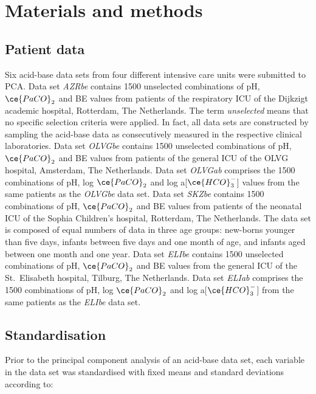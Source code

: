 \documentclass[
  12pt,
  a4paperpaper,
]{report}
\begin{document}
\hypertarget{materials-and-methods}{%
\section{Materials and methods}\label{materials-and-methods}}

\hypertarget{patient-data}{%
\subsection{Patient data}\label{patient-data}}

Six acid-base data sets from four different intensive care units were
submitted to PCA. Data set \emph{AZRbe} contains 1500 unselected
combinations of pH, \(\ce{PaCO}_{2}\) and BE values from patients of the
respiratory ICU of the Dijkzigt academic hospital, Rotterdam, The
Netherlands. The term \emph{unselected} means that no specific selection
criteria were applied. In fact, all data sets are constructed by
sampling the acid-base data as consecutively measured in the respective
clinical laboratories. Data set \emph{OLVGbe} contains 1500 unselected
combinations of pH, \(\ce{PaCO}_{2}\) and BE values from patients of the
general ICU of the OLVG hospital, Amsterdam, The Netherlands. Data set
\emph{OLVGab} comprises the 1500 combinations of pH, log
\(\ce{PaCO}_{2}\) and log a{[}\(\ce{HCO}_{3}^{-}\){]} values from the
same patients as the \emph{OLVGbe} data set. Data set \emph{SKZbe}
contains 1500 combinations of pH, \(\ce{PaCO}_{2}\) and BE values from
patients of the neonatal ICU of the Sophia Children's hospital,
Rotterdam, The Netherlands. The data set is composed of equal numbers of
data in three age groups: new-borns younger than five days, infants
between five days and one month of age, and infants aged between one
month and one year. Data set \emph{ELIbe} contains 1500 unselected
combinations of pH, \(\ce{PaCO}_{2}\) and BE values from the general ICU
of the St.~Elisabeth hospital, Tilburg, The Netherlands. Data set
\emph{ELIab} comprises the 1500 combinations of pH, log
\(\ce{PaCO}_{2}\) and log a{[}\(\ce{HCO}_{3}^{-}\){]} from the same
patients as the \emph{ELIbe} data set.

\hypertarget{standardisation}{%
\subsection{Standardisation}\label{standardisation}}

Prior to the principal component analysis of an acid-base data set, each
variable in the data set was standardised with fixed means and standard
deviations according to:
\end{document}
